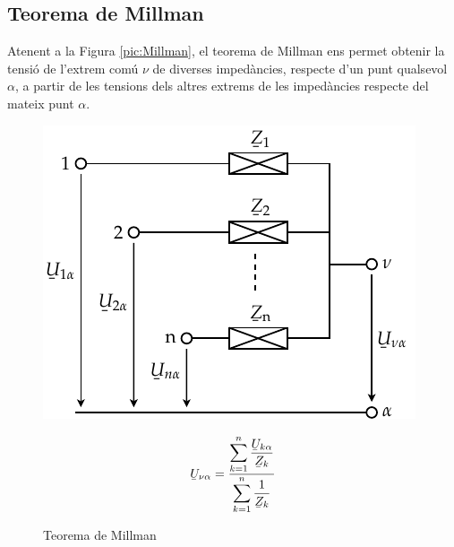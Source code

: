 \subsection{Teorema de Millman}

Atenent a la Figura \vref{pic:Millman}, el teorema
de Millman ens permet
obtenir la tensi\'{o} de l'extrem com\'{u} $\nu$ de diverses imped\`{a}ncies, respecte d'un punt
qualsevol $\alpha$, a partir de les tensions dels altres extrems de les imped\`{a}ncies respecte
 del mateix punt $\alpha$.

\begin{figure}[htb]
\hfill
\begin{minipage}[b]{7cm}
    \includegraphics{Imatges/Cap-Fonaments-Millman.pdf}
    \caption{Teorema de Millman} \label{pic:Millman}
\end{minipage}
\hfill
\begin{minipage}[b][4.5cm][t]{6cm}
    \begin{equation}
        \cmplx{U}_{\nu\alpha} = \frac{\displaystyle\sum_{k=1}^n \dfrac{\cmplx{U}_{k\alpha}}{\cmplx{Z}_k}} {\displaystyle\sum_{k=1}^n \dfrac{1}{\cmplx{Z}_k}}
    \end{equation}
\end{minipage}
\end{figure}

